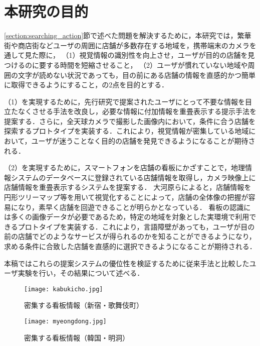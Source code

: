 \section{本研究の目的}
\label{section:purpose}
  \ref{section:searching_action}節で述べた問題を解決するために，本研究では，繁華街や商店街などユーザの周囲に店舗が多数存在する地域を，携帯端末のカメラを通して見た際に，
  （1）視覚情報の識別性を向上させ，ユーザが目的の店舗を見つけるのに要する時間を短縮させること，
  （2）ユーザが慣れていない地域や周囲の文字が読めない状況であっても，目の前にある店舗の情報を直感的かつ簡単に取得できるようにすること，の2点を目的とする．

  （1）を実現するために，先行研究\cite{Fujita:2013}で提案されたユーザにとって不要な情報を目立たなくさせる手法を改良し，必要な情報に付加情報を重畳表示する提示手法を提案する．さらに，全天球カメラで撮影した画像内において，条件に合う店舗を探索するプロトタイプを実装する．これにより，視覚情報が密集している地域において，ユーザが迷うことなく目的の店舗を発見できるようになることが期待される．

  （2）を実現するために，スマートフォンを店舗の看板にかざすことで，地理情報システムのデータベースに登録されている店舗情報を取得し，カメラ映像上に店舗情報を重畳表示するシステムを提案する．
  大河原らによると，店舗情報を円形ツリーマップ等を用いて視覚化することによって，店舗の全体像の把握が容易になり，素早く店舗を回遊できることが明らかとなっている\cite{Ookawara:2015}．
  看板の認識には多くの画像データが必要であるため，特定の地域を対象とした実環境で利用できるプロトタイプを実装する．これにより，言語障壁があっても，ユーザが目の前の店舗でどのようなサービスが得られるのかを知ることができるようになり，求める条件に合致した店舗を直感的に選択できるようになることが期待される．

  本稿ではこれらの提案システムの優位性を検証するために従来手法と比較したユーザ実験を行い，その結果について述べる．

  \begin{figure}[tb]
    \centerline{\texttt{[image: kabukicho.jpg]}}
    \caption{密集する看板情報（新宿・歌舞伎町）}
    \label{figure:kabukicho}
    \vspace{1cm}
    \centerline{\texttt{[image: myeongdong.jpg]}}
    \caption{密集する看板情報（韓国・明洞）}
    \label{figure:myeongdong}
  \end{figure}
